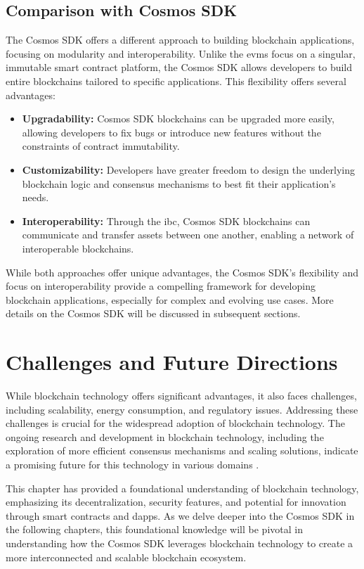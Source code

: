 \subsection{Comparison with Cosmos SDK}

The Cosmos SDK offers a different approach to building blockchain applications, focusing on modularity and interoperability. Unlike the \glspl{evm} focus on a singular, immutable smart contract platform, the Cosmos SDK allows developers to build entire blockchains tailored to specific applications. This flexibility offers several advantages:

\begin{itemize}
    \item \textbf{Upgradability:} Cosmos SDK blockchains can be upgraded more easily, allowing developers to fix bugs or introduce new features without the constraints of contract immutability.
    \item \textbf{Customizability:} Developers have greater freedom to design the underlying blockchain logic and consensus mechanisms to best fit their application's needs.
    \item \textbf{Interoperability:} Through the \gls{ibc}, Cosmos SDK blockchains can communicate and transfer assets between one another, enabling a network of interoperable blockchains.
\end{itemize}

While both approaches offer unique advantages, the Cosmos SDK's flexibility and focus on interoperability provide a compelling framework for developing blockchain applications, especially for complex and evolving use cases. More details on the Cosmos SDK will be discussed in subsequent sections.


\section{Challenges and Future Directions}

While blockchain technology offers significant advantages, it also faces challenges, including scalability, energy consumption, and regulatory issues. Addressing these challenges is crucial for the widespread adoption of blockchain technology. The ongoing research and development in blockchain technology, including the exploration of more efficient consensus mechanisms and scaling solutions, indicate a promising future for this technology in various domains \cite{croman2016scaling, swan2015blockchain}.

This chapter has provided a foundational understanding of blockchain technology, emphasizing its decentralization, security features, and potential for innovation through smart contracts and \gls{dapps}. As we delve deeper into the Cosmos SDK in the following chapters, this foundational knowledge will be pivotal in understanding how the Cosmos SDK leverages blockchain technology to create a more interconnected and scalable blockchain ecosystem.
